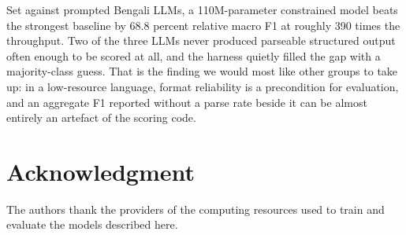 \documentclass[conference]{IEEEtran}
\begin{document}
Set against prompted Bengali LLMs, a 110M-parameter constrained model beats the strongest baseline by 68.8 percent relative macro F1 at roughly 390 times the throughput. Two of the three LLMs never produced parseable structured output often enough to be scored at all, and the harness quietly filled the gap with a majority-class guess. That is the finding we would most like other groups to take up: in a low-resource language, format reliability is a precondition for evaluation, and an aggregate F1 reported without a parse rate beside it can be almost entirely an artefact of the scoring code.

\section*{Acknowledgment}
The authors thank the providers of the computing resources used to train and evaluate the models described here.



\end{document}
